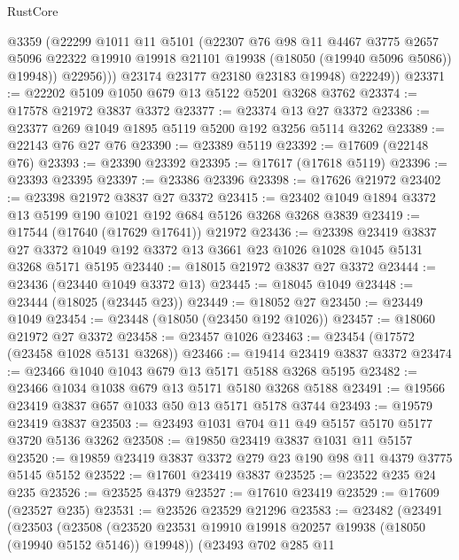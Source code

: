 \begin{lexlean}{RustCore}
\begin{coremodule}
                @3359
                (@22299
                  @1011
                  @11
                  @5101
                  (@22307
                    @76
                    @98
                    @11
                    @4467
                    @3775
                    @2657
                    @5096
                    @22322
                    @19910
                    @19918
                    @21101
                    @19938
                    (@18050 (@19940 @5096 @5086))
                    @19948))
                @22956)))
          @23174
          @23177
          @23180
          @23183
          @19948)
        @22249))
@23371 := @22202 @5109 @1050 @679 @13 @5122 @5201 @3268 @3762
@23374 := @17578 @21972 @3837 @3372
@23377 := @23374 @13 @27 @3372
@23386 := @23377 @269 @1049 @1895 @5119 @5200 @192 @3256 @5114 @3262
@23389 := @22143 @76 @27 @76
@23390 := @23389 @5119
@23392 := @17609 (@22148 @76)
@23393 := @23390 @23392
@23395 := @17617 (@17618 @5119)
@23396 := @23393 @23395
@23397 := @23386 @23396
@23398 := @17626 @21972
@23402 := @23398 @21972 @3837 @27 @3372
@23415 := @23402 @1049 @1894 @3372 @13 @5199 @190 @1021 @192 @684 @5126 @3268 @3268 @3839
@23419 := @17544 (@17640 (@17629 @17641)) @21972
@23436 := @23398
    @23419
    @3837
    @27
    @3372
    @1049
    @192
    @3372
    @13
    @3661
    @23
    @1026
    @1028
    @1045
    @5131
    @3268
    @5171
    @5195
@23440 := @18015 @21972 @3837 @27 @3372
@23444 := @23436 (@23440 @1049 @3372 @13)
@23445 := @18045 @1049
@23448 := @23444 (@18025 (@23445 @23))
@23449 := @18052 @27
@23450 := @23449 @1049
@23454 := @23448 (@18050 (@23450 @192 @1026))
@23457 := @18060 @21972 @27 @3372
@23458 := @23457 @1026
@23463 := @23454 (@17572 (@23458 @1028 @5131 @3268))
@23466 := @19414 @23419 @3837 @3372
@23474 := @23466 @1040 @1043 @679 @13 @5171 @5188 @3268 @5195
@23482 := @23466 @1034 @1038 @679 @13 @5171 @5180 @3268 @5188
@23491 := @19566 @23419 @3837 @657 @1033 @50 @13 @5171 @5178 @3744
@23493 := @19579 @23419 @3837
@23503 := @23493 @1031 @704 @11 @49 @5157 @5170 @5177 @3720 @5136 @3262
@23508 := @19850 @23419 @3837 @1031 @11 @5157
@23520 := @19859 @23419 @3837 @3372 @279 @23 @190 @98 @11 @4379 @3775 @5145 @5152
@23522 := @17601 @23419 @3837
@23525 := @23522 @235 @24 @235
@23526 := @23525 @4379
@23527 := @17610 @23419
@23529 := @17609 (@23527 @235)
@23531 := @23526 @23529 @21296
@23583 := @23482
    (@23491
      (@23503
        (@23508 (@23520 @23531 @19910 @19918 @20257 @19938 (@18050 (@19940 @5152 @5146)) @19948))
        (@23493
          @702
          @285
          @11

\end{coremodule}
\end{lexlean}
